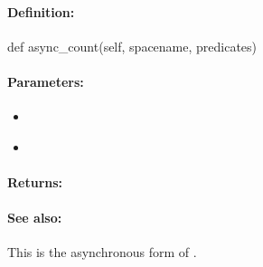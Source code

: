 \paragraph{Definition:}
\begin{pythoncode}
def async_count(self, spacename, predicates)
\end{pythoncode}

\paragraph{Parameters:}
\begin{itemize}[noitemsep]
\item {}\\

\item {}\\

\end{itemize}

\paragraph{Returns:}


\paragraph{See also:}  This is the asynchronous form of .
